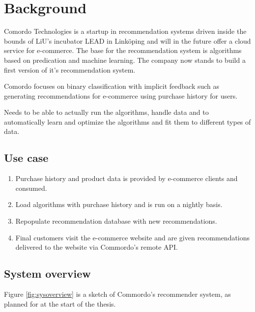 
\chapter{Background}\label{cha:background}

Comordo Technologies is a startup in recommendation systems driven inside the bounds of LiU's incubator LEAD in Linköping and will in the future offer a cloud service for e-commerce. The base for the recommendation system is algorithms based on predication and machine learning. The company now stands to build a first version of it's recommendation system.

Comordo focuses on binary classification with implicit feedback such as generating recommendations for e-commerce using purchase history for users.


Needs to be able to actually run the algorithms, handle data and to automatically learn and optimize the algorithms and fit them to different types of data.



\section{Use case}\label{sec:use}

\begin{enumerate}
    \item Purchase history and product data is provided by e-commerce clients and consumed.
    \item Load algorithms with purchase history and is run on a nightly basis.
    \item Repopulate recommendation database with new recommendations.
    \item Final customers visit the e-commerce website and are given recommendations delivered to the website via Commordo's remote API.
\end{enumerate}


\newpage
\section{System overview}\label{sec:sysoverview}

Figure \ref{fig:sysoverview} is a sketch of Commordo's recommender system, as planned for at the start of the thesis.

